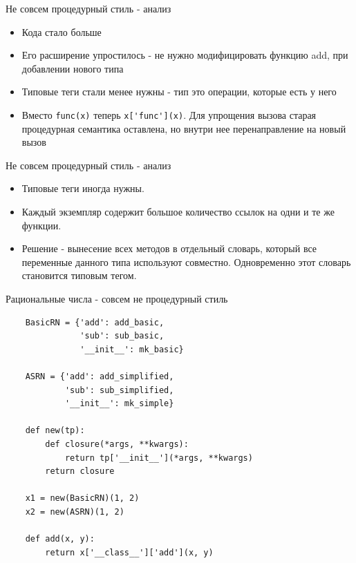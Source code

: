 \documentclass{article}
\begin{document}
\begin{center} Не совсем процедурный стиль - анализ \end{center}
\begin{itemize}
    \item Кода стало больше
    \item Его расширение упростилось - не нужно модифицировать функцию add,
          при добавлении нового типа
    \item Типовые теги стали менее нужны - тип это операции, которые есть у него
    \item Вместо \lstinline!func(x)! теперь \lstinline!x['func'](x)!. 
          Для упрощения вызова старая процедурная семантика оставлена,
          но внутри нее перенаправление на новый вызов
\end{itemize}
\newpage

\begin{center} Не совсем процедурный стиль - анализ \end{center}
\begin{itemize}
    \item Типовые теги иногда нужны.
    \item Каждый экземпляр содержит большое количество ссылок на одни и те же
          функции.
    \item Решение - вынесение всех методов в отдельный словарь, который все 
          переменные данного типа используют совместно. Одновременно этот
          словарь становится типовым тегом.
\end{itemize}
\newpage

\begin{center} Рациональные числа - совсем не процедурный стиль \end{center}
\begin{lstlisting}
    BasicRN = {'add': add_basic, 
               'sub': sub_basic,
               '__init__': mk_basic}

    ASRN = {'add': add_simplified, 
            'sub': sub_simplified,
            '__init__': mk_simple}

    def new(tp):
        def closure(*args, **kwargs):
            return tp['__init__'](*args, **kwargs)
        return closure

    x1 = new(BasicRN)(1, 2)
    x2 = new(ASRN)(1, 2)

    def add(x, y):
        return x['__class__']['add'](x, y)
\end{lstlisting}
\newpage
\end{document}
